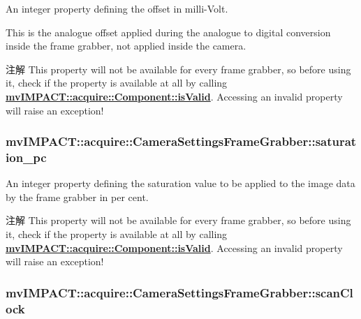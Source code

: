 An integer property defining the offset in milli-\/\+Volt. 

This is the analogue offset applied during the analogue to digital conversion inside the frame grabber, not applied inside the camera.

\begin{DoxyNote}{注解}
This property will not be available for every frame grabber, so before using it, check if the property is available at all by calling {\bfseries \hyperlink{classmv_i_m_p_a_c_t_1_1acquire_1_1_component_ac51e55e7e046101f3c6119d84123abd5}{mv\+I\+M\+P\+A\+C\+T\+::acquire\+::\+Component\+::is\+Valid}}. Accessing an invalid property will raise an exception! 
\end{DoxyNote}
\hypertarget{classmv_i_m_p_a_c_t_1_1acquire_1_1_camera_settings_frame_grabber_a5dd508932fef6e7843991055e4af8a85}{
\subsubsection[{saturation\+\_\+pc}]{ mv\+I\+M\+P\+A\+C\+T\+::acquire\+::\+Camera\+Settings\+Frame\+Grabber\+::saturation\+\_\+pc}}\label{classmv_i_m_p_a_c_t_1_1acquire_1_1_camera_settings_frame_grabber_a5dd508932fef6e7843991055e4af8a85}


An integer property defining the saturation value to be applied to the image data by the frame grabber in per cent. 

\begin{DoxyNote}{注解}
This property will not be available for every frame grabber, so before using it, check if the property is available at all by calling {\bfseries \hyperlink{classmv_i_m_p_a_c_t_1_1acquire_1_1_component_ac51e55e7e046101f3c6119d84123abd5}{mv\+I\+M\+P\+A\+C\+T\+::acquire\+::\+Component\+::is\+Valid}}. Accessing an invalid property will raise an exception! 
\end{DoxyNote}
\hypertarget{classmv_i_m_p_a_c_t_1_1acquire_1_1_camera_settings_frame_grabber_a35d5ae8944b725349b617465e42a3b49}{
\subsubsection[{scan\+Clock}]{ mv\+I\+M\+P\+A\+C\+T\+::acquire\+::\+Camera\+Settings\+Frame\+Grabber\+::scan\+Clock}}\label{classmv_i_m_p_a_c_t_1_1acquire_1_1_camera_settings_frame_grabber_a35d5ae8944b725349b617465e42a3b49}


